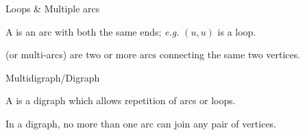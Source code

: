 \documentclass[aspectratio=43]{beamer}
\begin{document}



\begin{frame}{Loops \& Multiple arcs}
	\begin{definition}[{Loop}]
	A  is an arc with both the same ends; \emph{e.g.} $(u,u)$ is a loop.
\end{definition}
\vfill
	\begin{definition}
	 (or multi-arcs) are two or more arcs connecting the same two vertices.
	\end{definition}
\end{frame}
\begin{frame}{Multidigraph/Digraph}
	\begin{definition}[{Multidigraph}]
	A  is a digraph which allows repetition of arcs or loops.
	\end{definition}
	\vfill
	\begin{definition}[{Digraph}]
	In a digraph, no more than one arc can join any pair of vertices.
\end{definition}
\end{frame}
\end{document}
